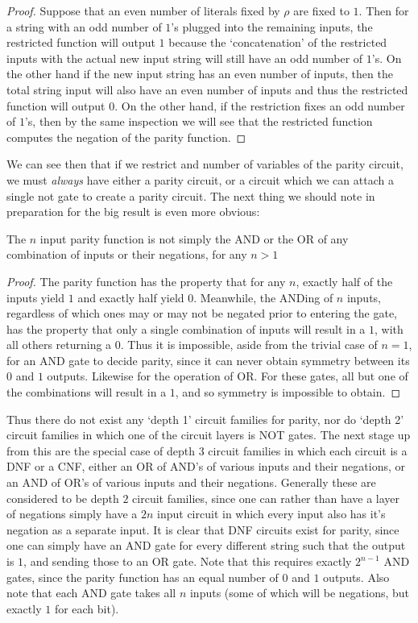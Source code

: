 \begin{proof}
	Suppose that an even number of literals fixed by $\rho$ are fixed to $1$. Then for a string with an odd number of $1$'s plugged into the remaining inputs, the restricted function will output $1$ because the `concatenation' of the restricted inputs with the actual new input string will still have an odd number of $1$'s. On the other hand if the new input string has an even number of inputs, then the total string input will also have an even number of inputs and thus the restricted function will output $0$. 	On the other hand, if the restriction fixes an odd number of $1$'s, then by the same inspection we will see that the restricted function computes the negation of the parity function. \par 
\end{proof}
We can see then that if we restrict and number of variables of the parity circuit, we must \textit{always} have either a parity circuit, or a circuit which we can attach a single not gate to create a parity circuit. The next thing we should note in preparation for the big result is even more obvious: 
\begin{fact}
	The $n$ input parity function is not simply the AND or the OR of any combination of inputs or their negations, for any $n>1$ 
\end{fact}
\begin{proof}
	The parity function has the property that for any $n$, exactly half of the inputs yield $1$ and exactly half yield $0$. Meanwhile, the ANDing of $n$ inputs, regardless of which ones may or may not be negated prior to entering the gate, has the property that only a single combination of inputs will result in a $1$, with all others returning a $0$. Thus it is impossible, aside from the trivial case of $n=1$, for an AND gate to decide parity, since it can never obtain symmetry between its $0$ and $1$ outputs. Likewise for the operation of OR. For these gates, all but one of the combinations will result in a $1$, and so symmetry is impossible to obtain. 
\end{proof}
Thus there do not exist any `depth 1' circuit families for parity, nor do `depth 2' circuit families in which one of the circuit layers is NOT gates. The next stage up from this are the special case of depth $3$ circuit families in which each circuit is a DNF or a CNF, either an OR of AND's of various inputs and their negations, or an AND of OR's of various inputs and their negations. Generally these are considered to be depth $2$ circuit families, since one can rather than have a layer of negations simply have a $2n$ input circuit in which every input also has it's negation as a separate input. It is clear that DNF circuits exist for parity, since one can simply have an AND gate for every different string such that the output is $1$, and sending those to an OR gate. Note that this requires exactly $2^{n-1}$ AND gates, since the parity function has an equal number of $0$ and $1$ outputs. Also note that each AND gate takes all $n$ inputs (some of which will be negations, but exactly $1$ for each bit). 
